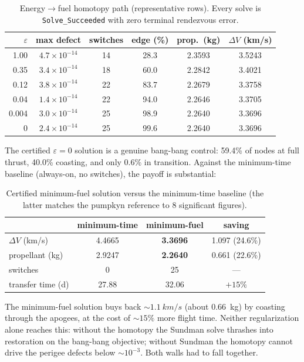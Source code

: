 \documentclass[11pt]{article}
\newcommand{\code}[1]{\texttt{#1}}
\begin{document}
\begin{table}[h]
\centering
\begin{tabular}{rccccc}
\toprule
$\varepsilon$ & max defect & switches & edge (\%) & prop.\ (kg) & $\Delta V$ (km/s)\\
\midrule
1.00 & $4.7\times10^{-14}$ & 14 & 28.3 & 2.3593 & 3.5243\\
0.35 & $3.4\times10^{-14}$ & 18 & 60.0 & 2.2842 & 3.4021\\
0.12 & $3.8\times10^{-14}$ & 22 & 83.7 & 2.2679 & 3.3758\\
0.04 & $1.4\times10^{-14}$ & 22 & 94.0 & 2.2646 & 3.3705\\
0.004& $3.0\times10^{-14}$ & 25 & 98.9 & 2.2640 & 3.3696\\
0    & $2.4\times10^{-14}$ & 25 & 99.6 & 2.2640 & 3.3696\\
\bottomrule
\end{tabular}
\caption{Energy$\to$fuel homotopy path (representative rows). Every solve is
\code{Solve\_Succeeded} with zero terminal rendezvous error.}
\label{tab:homotopy}
\end{table}

The certified $\varepsilon=0$ solution is a genuine bang-bang control: 59.4\% of
nodes at full thrust, 40.0\% coasting, and only 0.6\% in transition. Against the
minimum-time baseline (always-on, no switches), the payoff is substantial:

\begin{table}[h]
\centering
\begin{tabular}{lccc}
\toprule
 & minimum-time & minimum-fuel & saving\\
\midrule
$\Delta V$ (km/s)     & 4.4665 & \textbf{3.3696} & 1.097 (24.6\%)\\
propellant (kg)       & 2.9247 & \textbf{2.2640} & 0.661 (22.6\%)\\
switches              & 0 & 25 & ---\\
transfer time (d)     & 27.88 & 32.06 & $+15\%$\\
\bottomrule
\end{tabular}
\caption{Certified minimum-fuel solution versus the minimum-time baseline
(the latter matches the pumpkyn reference to 8 significant figures).}
\label{tab:compare}
\end{table}

\noindent The minimum-fuel solution buys back $\sim\!\SI{1.1}{km/s}$ (about
\SI{0.66}{kg}) by coasting through the apogees, at the cost of $\sim15\%$ more
flight time. Neither regularization alone reaches this: without the homotopy the
Sundman solve thrashes into restoration on the bang-bang objective; without
Sundman the homotopy cannot drive the perigee defects below $\sim\!10^{-3}$.
Both walls had to fall together.
\end{document}
